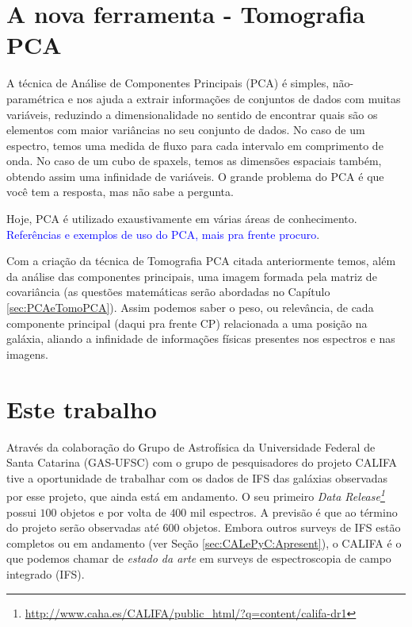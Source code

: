 \section{A nova ferramenta - Tomografia PCA}
\label{sec:Intro:TomoPCA}

A técnica de Análise de Componentes Principais (PCA) é simples, não-paramétrica
e nos ajuda a extrair informações de conjuntos de dados com muitas variáveis,
reduzindo a dimensionalidade no sentido de encontrar quais são os elementos com
maior variâncias no seu conjunto de dados. No caso de um espectro, temos uma
medida de fluxo para cada intervalo em comprimento de onda. No caso de um cubo
de spaxels, temos as dimensões espaciais também, obtendo assim uma infinidade de
variáveis. O grande problema do PCA é que você tem a resposta, mas não sabe a
pergunta.

Hoje, PCA é utilizado exaustivamente em várias áreas de conhecimento. \ojo
\citneed \textcolor{blue}{Referências e exemplos de uso do PCA, mais pra
frente procuro}.

Com a criação da técnica de Tomografia PCA citada anteriormente temos, além da
análise das componentes principais, uma imagem formada pela matriz de
covariância (as questões matemáticas serão abordadas no
Capítulo \ref{sec:PCAeTomoPCA}). Assim podemos saber o peso, ou relevância, de
cada componente principal (daqui pra frente CP) relacionada a uma posição na
galáxia, aliando a infinidade de informações físicas presentes nos espectros e
nas imagens.

\section{Este trabalho}
\label{sec:Intro:ThisWork}

Através da colaboração do Grupo de Astrofísica da Universidade Federal de Santa
Catarina (GAS-UFSC) com o grupo de pesquisadores do projeto CALIFA tive a
oportunidade de trabalhar com os dados de IFS das galáxias observadas por esse
projeto, que ainda está em andamento. O seu primeiro {\em Data
Release\footnote{\url{http://www.caha.es/CALIFA/public_html/?q=content/califa-dr1}}}
\citep{Husemann2013} possui $100$ objetos e por volta de $400$ mil espectros. A
previsão é que ao término do projeto serão observadas até $600$ objetos. Embora
outros surveys de IFS estão completos ou em andamento (ver Seção
\ref{sec:CALePyC:Apresent}), o CALIFA é o que podemos chamar de {\em estado da
arte} em surveys de espectroscopia de campo integrado (IFS).

